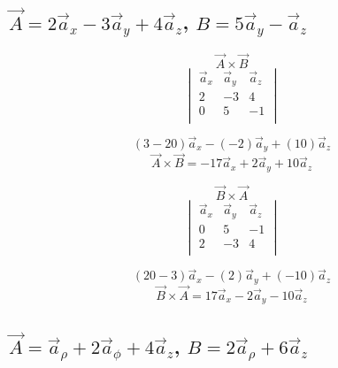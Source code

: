 \documentclass[14pt]{extarticle}
\begin{document}
\boldmath
\subsection{$\vec{A}=2\vec{a}_x-3\vec{a}_y+4\vec{a}_z$, $B=5\vec{a}_y-\vec{a}_z$}
\unboldmath

\begin{multicols}{2}
	\begin{center}
		$$\vec{A}\times\vec{B}$$
		\[
			\begin{vmatrix}
				\vec{a}_x & \vec{a}_y & \vec{a}_z \\
				2         & -3        & 4         \\
				0         & 5         & -1        \\
			\end{vmatrix}
		\]

		$$(3-20)\vec{a}_x-(-2)\vec{a}_y+(10)\vec{a}_z$$
		$$\vec{A}\times\vec{B}=-17\vec{a}_x+2\vec{a}_y+10\vec{a}_z$$
	\end{center}
	\begin{center}
		$$\vec{B}\times\vec{A}$$
		\[
			\begin{vmatrix}
				\vec{a}_x & \vec{a}_y & \vec{a}_z \\
				0         & 5         & -1        \\
				2         & -3        & 4         \\
			\end{vmatrix}
		\]

		$$(20-3)\vec{a}_x-(2)\vec{a}_y+(-10)\vec{a}_z$$
		$$\vec{B}\times\vec{A}=17\vec{a}_x-2\vec{a}_y-10\vec{a}_z$$
	\end{center}
\end{multicols}

\boldmath
\subsection{$\vec{A}=\vec{a}_\rho+2\vec{a}_\phi+4\vec{a}_z$, $B=2\vec{a}_\rho+6\vec{a}_z$}
\unboldmath
\end{document}
